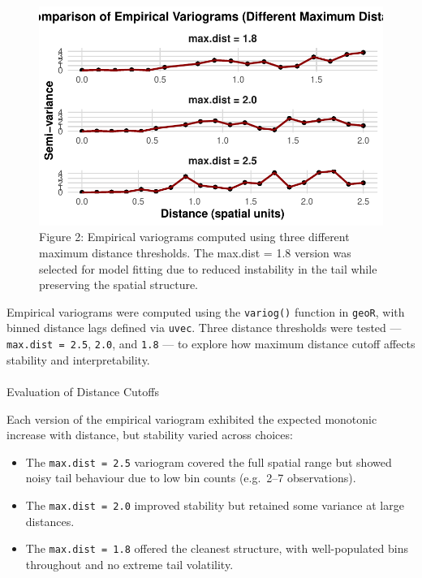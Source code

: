 \documentclass[
  11pt,
]{article}
\makeatletter
\let\oldparagraph\paragraph
\renewcommand{\paragraph}{
    \@ifstar
      \xxxParagraphStar
      \xxxParagraphNoStar
  }
\newcommand{\xxxParagraphStar}[1]{\oldparagraph*{#1}\mbox{}}
\newcommand{\xxxParagraphNoStar}[1]{\oldparagraph{#1}\mbox{}}
\makeatother
\begin{document}
\begin{figure}[H]

{\centering \includegraphics{project_files/figure-pdf/fig-variogcompare-1.pdf}

}

\caption{Figure 2: Empirical variograms computed using three different
maximum distance thresholds. The max.dist = 1.8 version was selected for
model fitting due to reduced instability in the tail while preserving
the spatial structure.}

\end{figure}%

Empirical variograms were computed using the \texttt{variog()} function
in \texttt{geoR}, with binned distance lags defined via \texttt{uvec}.
Three distance thresholds were tested --- \texttt{max.dist\ =\ 2.5},
\texttt{2.0}, and \texttt{1.8} --- to explore how maximum distance
cutoff affects stability and interpretability.

\paragraph{Evaluation of Distance
Cutoffs}\label{evaluation-of-distance-cutoffs}

Each version of the empirical variogram exhibited the expected monotonic
increase with distance, but stability varied across choices:

\begin{itemize}
\item
  The \texttt{max.dist\ =\ 2.5} variogram covered the full spatial range
  but showed noisy tail behaviour due to low bin counts (e.g.~2--7
  observations).
\item
  The \texttt{max.dist\ =\ 2.0} improved stability but retained some
  variance at large distances.
\item
  The \texttt{max.dist\ =\ 1.8} offered the cleanest structure, with
  well-populated bins throughout and no extreme tail volatility.
\end{itemize}
\end{document}

